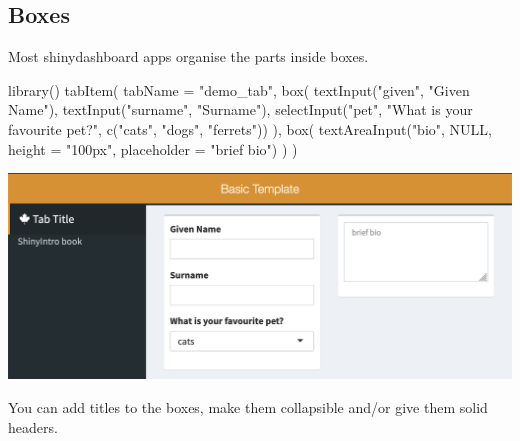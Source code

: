\documentclass[
]{book}
\newenvironment{Shaded}{\begin{snugshade}}{\end{snugshade}}
\newcommand{\AttributeTok}[1]{\textcolor[rgb]{0.77,0.63,0.00}{#1}}
\newcommand{\ConstantTok}[1]{\textcolor[rgb]{0.00,0.00,0.00}{#1}}
\newcommand{\FunctionTok}[1]{\textcolor[rgb]{0.00,0.00,0.00}{#1}}
\newcommand{\NormalTok}[1]{#1}
\newcommand{\StringTok}[1]{\textcolor[rgb]{0.31,0.60,0.02}{#1}}
\begin{document}
\hypertarget{boxes}{%
\subsection{Boxes}\label{boxes}}

Most shinydashboard apps organise the parts inside boxes.

\begin{Shaded}
\begin{Highlighting}[]
\FunctionTok{library}\NormalTok{() }
\FunctionTok{tabItem}\NormalTok{(}
    \AttributeTok{tabName =} \StringTok{"demo\_tab"}\NormalTok{,}
    \FunctionTok{box}\NormalTok{(}
      \FunctionTok{textInput}\NormalTok{(}\StringTok{"given"}\NormalTok{, }\StringTok{"Given Name"}\NormalTok{),}
      \FunctionTok{textInput}\NormalTok{(}\StringTok{"surname"}\NormalTok{, }\StringTok{"Surname"}\NormalTok{),}
      \FunctionTok{selectInput}\NormalTok{(}\StringTok{"pet"}\NormalTok{, }\StringTok{"What is your favourite pet?"}\NormalTok{, }\FunctionTok{c}\NormalTok{(}\StringTok{"cats"}\NormalTok{, }\StringTok{"dogs"}\NormalTok{, }\StringTok{"ferrets"}\NormalTok{))}
\NormalTok{    ),}
    \FunctionTok{box}\NormalTok{(}
       \FunctionTok{textAreaInput}\NormalTok{(}\StringTok{"bio"}\NormalTok{, }\ConstantTok{NULL}\NormalTok{, }\AttributeTok{height =} \StringTok{"100px"}\NormalTok{, }\AttributeTok{placeholder =} \StringTok{"brief bio"}\NormalTok{)}
\NormalTok{    )}
\NormalTok{)}
\end{Highlighting}
\end{Shaded}

\includegraphics{images/sdb_layout2.png}

You can add titles to the boxes, make them collapsible and/or give them solid headers.
\end{document}

